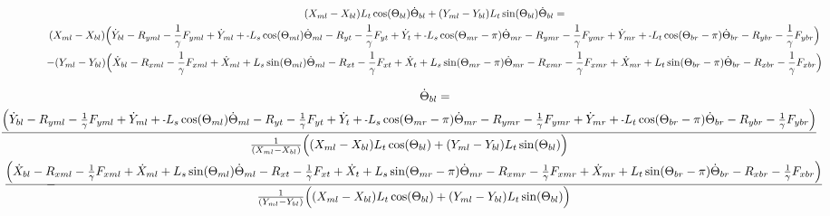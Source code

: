 \documentclass[11pt, landscape]{article}
\newcommand{\mn}{\scalebox{0.7}[1.0]{-}}
\begin{document}
\begin{multline}
(X_{ml} - X_{bl}) L_{t}\cos(\Theta_{bl}) \dot{\Theta}_{bl} + (Y_{ml} - Y_{bl})L_{t}\sin(\Theta_{bl}) \dot{\Theta}_{bl} = \\
(X_{ml} - X_{bl})\Big( \dot{Y}_{bl} - R_{yml} - \frac{1}{\gamma}F_{yml} + \dot{Y}_{ml} + \mn L_{s}\cos(\Theta_{ml}) \dot{\Theta}_{ml}
- R_{yt} - \frac{1}{\gamma}F_{yt } + \dot{Y}_{t } + \mn L_{s}\cos(\Theta_{mr}-\pi)  \dot{\Theta}_{mr} - R_{ymr} - \frac{1}{\gamma}F_{ymr} + \dot{Y}_{mr}
+ \mn L_{t}\cos(\Theta_{br}-\pi)  \dot{\Theta}_{br} - R_{ybr} - \frac{1}{\gamma}F_{ybr} \Big) \\
- (Y_{ml} - Y_{bl})\Big( \dot{X}_{bl} - R_{xml} - \frac{1}{\gamma}F_{xml} + \dot{X}_{ml} + L_{s}\sin(\Theta_{ml}) \dot{\Theta}_{ml} - R_{xt } - \frac{1}{\gamma}F_{xt }
+ \dot{X}_{t } + L_{s}\sin(\Theta_{mr}-\pi)  \dot{\Theta}_{mr} - R_{xmr}  -\frac{1}{\gamma}F_{xmr} + \dot{X}_{mr} + L_{t}\sin(\Theta_{br}-\pi)  \dot{\Theta}_{br} - R_{xbr} - \frac{1}{\gamma}F_{xbr} \Big)
\end{multline}

\begin{multline}
\dot{\Theta}_{bl} = \\
\hspace*{-1.5cm}\frac{\Big( \dot{Y}_{bl} - R_{yml} - \frac{1}{\gamma}F_{yml} + \dot{Y}_{ml} + \mn L_{s}\cos(\Theta_{ml}) \dot{\Theta}_{ml}
- R_{yt} - \frac{1}{\gamma}F_{yt } + \dot{Y}_{t } + \mn L_{s}\cos(\Theta_{mr}-\pi)  \dot{\Theta}_{mr} - R_{ymr} - \frac{1}{\gamma}F_{ymr} + \dot{Y}_{mr}
+ \mn L_{t}\cos(\Theta_{br}-\pi)  \dot{\Theta}_{br} - R_{ybr} - \frac{1}{\gamma}F_{ybr} \Big)}
{\frac{1}{(X_{ml} - X_{bl})}\Big( (X_{ml} - X_{bl}) L_{t}\cos(\Theta_{bl}) + (Y_{ml} - Y_{bl})L_{t}\sin(\Theta_{bl}) \Big)} \\
- \hspace*{-1.5cm}\frac{\Big( \dot{X}_{bl} - R_{xml} - \frac{1}{\gamma}F_{xml} + \dot{X}_{ml} + L_{s}\sin(\Theta_{ml}) \dot{\Theta}_{ml} - R_{xt } - \frac{1}{\gamma}F_{xt }
+ \dot{X}_{t } + L_{s}\sin(\Theta_{mr}-\pi)  \dot{\Theta}_{mr} - R_{xmr}  -\frac{1}{\gamma}F_{xmr} + \dot{X}_{mr} + L_{t}\sin(\Theta_{br}-\pi)  \dot{\Theta}_{br} - R_{xbr} - \frac{1}{\gamma}F_{xbr} \Big)}
{\frac{1}{(Y_{ml} - Y_{bl})}\Big( (X_{ml} - X_{bl}) L_{t}\cos(\Theta_{bl}) + (Y_{ml} - Y_{bl})L_{t}\sin(\Theta_{bl}) \Big)}
\end{multline}
\end{document}
